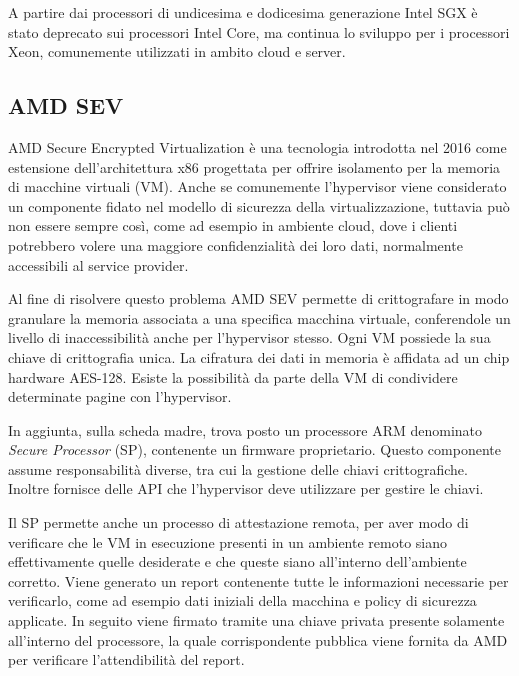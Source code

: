 \documentclass[12pt,italian]{report}
\begin{document}
	\bigbreak
	
	A partire dai processori di undicesima e dodicesima generazione Intel SGX è stato deprecato sui processori Intel Core, ma continua lo sviluppo per i processori Xeon, comunemente utilizzati in ambito cloud e server.
	
	\subsection{AMD SEV}
	\label{subsec:sev}
	AMD Secure Encrypted Virtualization è una tecnologia introdotta nel 2016 come estensione dell'architettura x86 progettata per offrire isolamento per la memoria di macchine virtuali (VM). Anche se comunemente l'hypervisor viene considerato un componente fidato nel modello di sicurezza della virtualizzazione, tuttavia può non essere sempre così, come ad esempio in ambiente cloud, dove i clienti potrebbero volere una maggiore confidenzialità dei loro dati, normalmente accessibili al service provider.
	
	Al fine di risolvere questo problema AMD SEV permette di crittografare in modo granulare la memoria associata a una specifica macchina virtuale, conferendole un livello di inaccessibilità anche per l'hypervisor stesso. Ogni VM possiede la sua chiave di crittografia unica. La cifratura dei dati in memoria è affidata ad un chip hardware AES-128. Esiste la possibilità da parte della VM di condividere determinate pagine con l'hypervisor.
	
	In aggiunta, sulla scheda madre, trova posto un processore ARM denominato \textit{Secure Processor} (SP), contenente un firmware proprietario. Questo componente assume responsabilità diverse, tra cui la gestione delle chiavi crittografiche. Inoltre fornisce delle API che l'hypervisor deve utilizzare per gestire le chiavi.
	
	\bigbreak
	
	Il SP permette anche un processo di attestazione remota, per aver modo di verificare che le VM in esecuzione presenti in un ambiente remoto siano effettivamente quelle desiderate e che queste siano all'interno dell'ambiente corretto. Viene generato un report contenente tutte le informazioni necessarie per verificarlo, come ad esempio dati iniziali della macchina e policy di sicurezza applicate. In seguito viene firmato tramite una chiave privata presente solamente all'interno del processore, la quale corrispondente pubblica viene fornita da AMD per verificare l'attendibilità del report.
	
	\bigbreak
	
\end{document}
